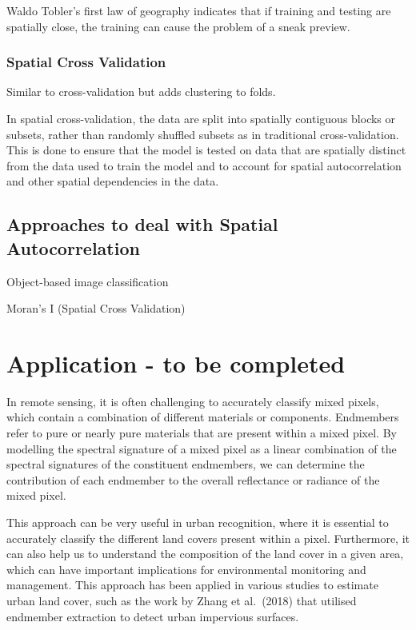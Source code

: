 \documentclass[
  letterpaper,
  DIV=11,
  numbers=noendperiod]{scrreprt}
\begin{document}
Waldo Tobler's first law of geography indicates that if training and
testing are spatially close, the training can cause the problem of a
sneak preview.

\hypertarget{spatial-cross-validation}{%
\subsubsection{Spatial Cross
Validation}\label{spatial-cross-validation}}

Similar to cross-validation but adds clustering to folds.

In spatial cross-validation, the data are split into spatially
contiguous blocks or subsets, rather than randomly shuffled subsets as
in traditional cross-validation. This is done to ensure that the model
is tested on data that are spatially distinct from the data used to
train the model and to account for spatial autocorrelation and other
spatial dependencies in the data.

\hypertarget{approaches-to-deal-with-spatial-autocorrelation}{%
\subsection{Approaches to deal with Spatial
Autocorrelation}\label{approaches-to-deal-with-spatial-autocorrelation}}

Object-based image classification

Moran's I (Spatial Cross Validation)

\hypertarget{application---to-be-completed}{%
\section{Application - to be
completed}\label{application---to-be-completed}}

In remote sensing, it is often challenging to accurately classify mixed
pixels, which contain a combination of different materials or
components. Endmembers refer to pure or nearly pure materials that are
present within a mixed pixel. By modelling the spectral signature of a
mixed pixel as a linear combination of the spectral signatures of the
constituent endmembers, we can determine the contribution of each
endmember to the overall reflectance or radiance of the mixed pixel.

This approach can be very useful in urban recognition, where it is
essential to accurately classify the different land covers present
within a pixel. Furthermore, it can also help us to understand the
composition of the land cover in a given area, which can have important
implications for environmental monitoring and management. This approach
has been applied in various studies to estimate urban land cover, such
as the work by Zhang et al.~(2018) that utilised endmember extraction to
detect urban impervious surfaces.
\end{document}
